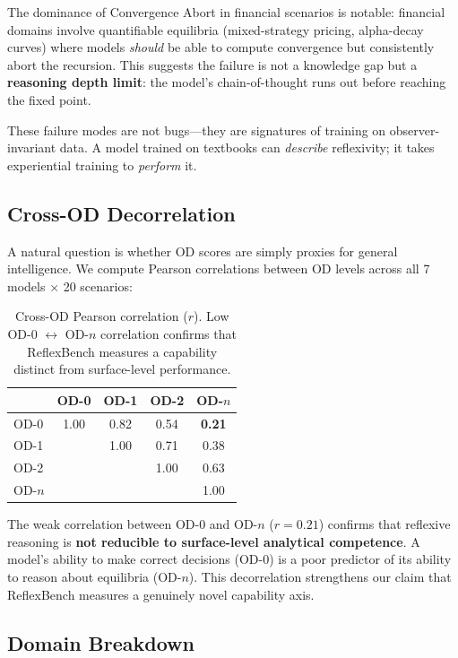 \documentclass{article}
\begin{document}
The dominance of Convergence Abort in financial scenarios is notable: financial domains involve quantifiable equilibria (mixed-strategy pricing, alpha-decay curves) where models \textit{should} be able to compute convergence but consistently abort the recursion. This suggests the failure is not a knowledge gap but a \textbf{reasoning depth limit}: the model's chain-of-thought runs out before reaching the fixed point.

These failure modes are not bugs---they are signatures of training on observer-invariant data. A model trained on textbooks can \textit{describe} reflexivity; it takes experiential training to \textit{perform} it.

\subsection{Cross-OD Decorrelation}

A natural question is whether OD scores are simply proxies for general intelligence. We compute Pearson correlations between OD levels across all 7 models $\times$ 20 scenarios:

\begin{table}[h]
\centering
\caption{Cross-OD Pearson correlation ($r$). Low OD-0 $\leftrightarrow$ OD-$n$ correlation confirms that ReflexBench measures a capability distinct from surface-level performance.}
\label{tab:decorrelation}
\begin{tabular}{@{}lcccc@{}}
\toprule
& OD-0 & OD-1 & OD-2 & OD-$n$ \\
\midrule
OD-0 & 1.00 & 0.82 & 0.54 & \textbf{0.21} \\
OD-1 & & 1.00 & 0.71 & 0.38 \\
OD-2 & & & 1.00 & 0.63 \\
OD-$n$ & & & & 1.00 \\
\bottomrule
\end{tabular}
\end{table}

The weak correlation between OD-0 and OD-$n$ ($r = 0.21$) confirms that reflexive reasoning is \textbf{not reducible to surface-level analytical competence}. A model's ability to make correct decisions (OD-0) is a poor predictor of its ability to reason about equilibria (OD-$n$). This decorrelation strengthens our claim that ReflexBench measures a genuinely novel capability axis.

\subsection{Domain Breakdown}
\end{document}
